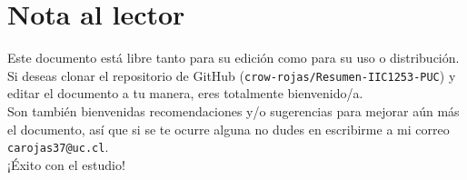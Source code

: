 \section*{Nota al lector}
Este documento está libre tanto para su edición como para su uso o distribución. Si deseas clonar el repositorio de GitHub (\verb|crow-rojas/Resumen-IIC1253-PUC|) y editar el documento a tu manera, eres totalmente bienvenido/a. \\

Son también bienvenidas recomendaciones y/o sugerencias para mejorar aún más el documento, así que si se te ocurre alguna no dudes en escribirme a mi correo \verb|carojas37@uc.cl|. \\

¡Éxito con el estudio!

    